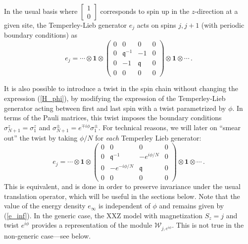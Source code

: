 \documentclass[a4paper,10pt]{article}
\newcommand{\q}{\mathfrak{q}}
\newcommand{\aSt}{\mathcal{W}}
\newcommand{\AStTL}[2]{\aSt_{#1,#2}}
\newcommand{\HN}{\mathcal{H}}
\begin{document}
In the usual basis where $\left[ \begin{smallmatrix} 1\\ 0 \end{smallmatrix} \right]$ corresponds to spin up in the $z$-direction at a given site, the Temperley-Lieb generator $e_j$ acts on spins $j, j+1$ (with periodic boundary conditions) as 
\begin{equation} e_j = \cdots \otimes\mathbf{1}\otimes
\begin{pmatrix}
0 & 0 & 0 & 0 \\
0 & \q^{-1} & -1 & 0\\
0& -1 & \q & 0\\
0 & 0 & 0 & 0 
\end{pmatrix} \otimes \mathbf{1}\otimes \cdots \,.
\end{equation}
%

It is also possible to introduce a twist in the spin chain without changing the expression (\ref{H_phi}), 
 by modifying the expression of the Temperley-Lieb generator acting between first and last spin with a twist parametrized by $\phi$.  
In terms of the Pauli matrices, this twist imposes the boundary conditions $\sigma^z_{N+1}=\sigma^z_1$ and $\sigma^{\pm}_{N+1}=e^{\mp i \phi} \sigma^{\pm}_1$.
%
%
%
For technical reasons,  we will later on ``smear out'' the twist by taking $\phi/N$ for \emph{each} Temperley Lieb generator:
\begin{equation}\label{TLmatrix_spin} e_j = \cdots \otimes\mathbf{1}\otimes
\begin{pmatrix}
0 & 0 & 0 & 0 \\
0 & \q^{-1} & -e^{i\phi/N} & 0\\
0 & -e^{-i\phi/N} & \q & 0\\
0 & 0 & 0 & 0 
\end{pmatrix}\otimes \mathbf{1}\otimes \cdots \,.
\end{equation}
This is equivalent, and is done in order to preserve invariance under the usual translation operator, which will be useful in the sections below.  Note that the value of the energy density $e_\infty$ is independent of $\phi$ and remains given by (\ref{e_inf}). In the generic case, the XXZ model with magnetization $S_z=j$ and twist $e^{i\phi}$ provides a representation of the module $\AStTL{j}{e^{i\phi}}$. This is not true in the non-generic case---see below. 
\end{document}
